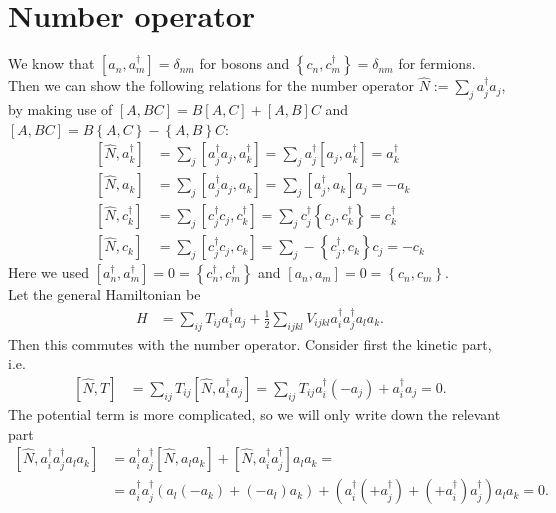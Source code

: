 \documentclass[english, parskip=full]{scrartcl}
\newcommand{\kla}{}
\newcommand{\klam}{}
\newcommand{\klammer}{}
\begin{document}
\section{Number operator}
We know that $\klam\left[ {a_n,a_m^\dagger} \right]=\delta_{nm}$ for bosons and $\klammer\left\{{c_n,c_m^\dagger} \right\}=\delta_{nm}$ for fermions.
Then we can show the following relations for the number operator $\hat{N}:=\sum_j a_j^\dagger a_j$, by making use of $\klam\left[ {A,BC} \right]=B\klam\left[ {A,C} \right]+\klam\left[ {A,B} \right]C$ and $\klam\left[ {A,BC} \right]=B\klammer\left\{{A,C} \right\}-\klammer\left\{{A,B} \right\}C$:
\begin{align*}
\klam\left[ {\hat{N},a_k^\dagger} \right]&=\sum_j\klam\left[ {a_j^\dagger a_j,a_k^\dagger} \right]=\sum_j a_j^\dagger \klam\left[ {a_j,a_k^\dagger} \right]=a_k^\dagger\\
\klam\left[ {\hat{N},a_k} \right]&=\sum_j\klam\left[ {a_j^\dagger a_j,a_k} \right]=\sum_j \klam\left[ {a_j^\dagger,a_k} \right]a_j =-a_k\\
\klam\left[ {\hat{N},c_k^\dagger} \right]&=\sum_j\klam\left[ {c_j^\dagger c_j,c_k^\dagger} \right]=\sum_jc_j^\dagger\klammer\left\{{c_j,c_k^\dagger} \right\}=c_k^\dagger\\
\klam\left[ {\hat{N},c_k} \right]&=\sum_j\klam\left[ {c_j^\dagger c_j,c_k} \right]=\sum_j-\klammer\left\{{c_j^\dagger,c_k} \right\}c_j=-c_k
\end{align*}
Here we used $\klam\left[ {a_n^\dagger,a_m^\dagger} \right]=0=\klammer\left\{{c_n^\dagger,c_m^\dagger} \right\}$ and $\klam\left[ {a_n,a_m} \right]=0=\klammer\left\{{c_n,c_m} \right\}$.
\\
Let the general Hamiltonian be
\begin{align*}
H&=\sum_{ij}T_{ij}a_i^\dagger a_j+\frac{1}{2}\sum_{ijkl}V_{ijkl}a_i^\dagger a_j^\dagger a_l a_k.
\end{align*}
Then this commutes with the number operator. 
Consider first the kinetic part, i.e.
\begin{align*}
\klam\left[ {\hat{N},T} \right]&=\sum_{ij}T_{ij}\klam\left[ {\hat{N},a_i^\dagger a_j} \right]=\sum_{ij}T_{ij}a_i^\dagger (-a_j)+a_i^\dagger a_j=0.
\end{align*}
The potential term is more complicated, so we will only write down the relevant part
\begin{align*}
\klam\left[ {\hat{N},a_i^\dagger a_j^\dagger a_l a_k} \right]&=a_i^\dagger a_j^\dagger \klam\left[ {\hat{N},a_l a_k} \right]+\klam\left[ {\hat{N},a_i^\dagger a_j^\dagger} \right]a_l a_k=\\
&=a_i^\dagger a_j^\dagger\kla\left( {a_l(-a_k) + (-a_l)a_k} \right)+\kla\left( {a_i^\dagger (+a_j^\dagger) + (+a_i^\dagger) a_j^\dagger} \right)a_l a_k=0.
\end{align*}
\end{document}
